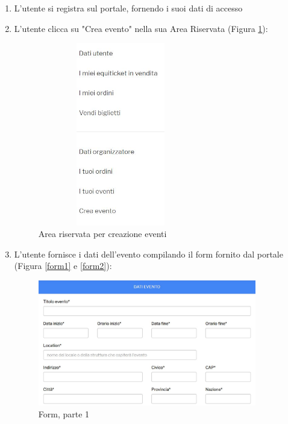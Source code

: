 \begin{enumerate}
\item L'utente si registra sul portale, fornendo i suoi dati di accesso
\item L'utente clicca su "Crea evento" nella sua Area Riservata (Figura \ref{crea}):
\begin{figure}[htbp]
	\centering
	\includegraphics[width=0.68\textwidth, height=8cm]{chapter4/immagini/creaevento}
	\caption{Area riservata per creazione eventi}
	\label{crea}
\end{figure} 
\item L'utente fornisce i dati dell'evento compilando il form fornito dal portale (Figura \ref{form1} e \ref{form2}):
\begin{figure}[htbp]
    \centering
    \begin{minipage}{0.45\textwidth}
        \centering
        \includegraphics[width=0.9\textwidth]{chapter4/immagini/form1} %
        \caption{Form, parte 1}
    \end{minipage}\hfill
    \begin{minipage}{0.45\textwidth}
        \centering

\end{minipage}
\end{figure}
\end{enumerate}
